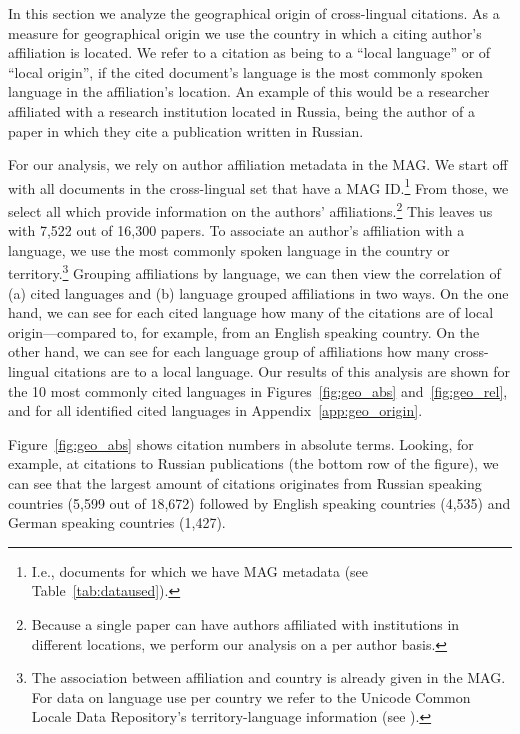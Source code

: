 In this section we analyze the geographical origin of cross-lingual citations. As a measure for geographical origin we use the country in which a citing author's affiliation is located. We refer to a citation as being to a ``local language'' or of ``local origin'', if the cited document's language is the most commonly spoken language in the affiliation's location. An example of this would be a researcher affiliated with a research institution located in Russia, being the author of a paper in which they cite a publication written in Russian.

For our analysis, we rely on author affiliation metadata in the MAG. We start off with all documents in the cross-lingual set that have a MAG ID.\footnote{I.e., documents for which we have MAG metadata (see Table~\ref{tab:dataused}).} From those, we select all which provide information on the authors' affiliations.\footnote{Because a single paper can have authors affiliated with institutions in different locations, we perform our analysis on a per author basis.} This leaves us with 7,522 out of 16,300 papers. To associate an author's affiliation with a language, we use the most commonly spoken language in the country or territory.\footnote{The association between affiliation and country is already given in the MAG. For data on language use per country we refer to the Unicode Common Locale Data Repository's territory-language information (see ).} Grouping affiliations by language, we can then view the correlation of (a) cited languages and (b) language grouped affiliations in two ways. On the one hand, we can see for each cited language how many of the citations are of local origin---compared to, for example, from an English speaking country. On the other hand, we can see for each language group of affiliations how many cross-lingual citations are to a local language. Our results of this analysis are shown for the 10 most commonly cited languages in Figures~\ref{fig:geo_abs} and~\ref{fig:geo_rel}, and for all identified cited languages in Appendix~\ref{app:geo_origin}.

Figure~\ref{fig:geo_abs} shows citation numbers in absolute terms. Looking, for example, at citations to Russian publications (the bottom row of the figure), we can see that the largest amount of citations originates from Russian speaking countries (5,599 out of 18,672) followed by English speaking countries (4,535) and German speaking countries (1,427).

